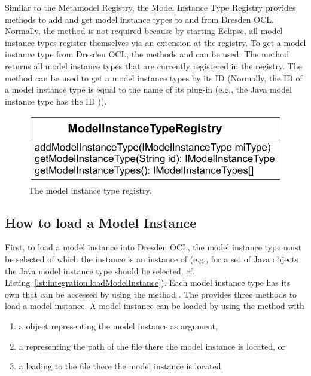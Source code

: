 Similar to the Metamodel Registry, the Model Instance Type Registry provides 
methods to add and get model instance types to and from Dresden OCL. Normally,
the method 
is not required because by starting Eclipse, all model instance types register
themselves via an extension at the registry. To get a model instance type from
Dresden OCL, the methods  and
 can be used. The method 
 returns all model instance types that are
currently registered in the registry. The method  can be used to get a model instance types by its ID (Normally, the ID 
of a model instance type is equal to the name of its plug-in (e.g., the Java 
model instance type has the ID 
)).

\begin{figure}[!b]
	\centering
	\includegraphics[width=.7\linewidth]{figures/integration/modelInstanceTypeRegistry}
	\caption{The model instance type registry.}
	\label{pic:integration:modelInstanceTypeRegistry}
\end{figure}


\subsection{How to load a Model Instance}

First, to load a model instance into Dresden OCL, the model instance type must be
selected of which the instance is an instance of (e.g., for a set of Java
objects the Java model instance type should be selected, cf. 
Listing~\ref{lst:integration:loadModelInstance}). Each model instance type has
its own  that can be accessed by using the
method . The 
 provides three methods to load a model instance. 
A model instance can be loaded by using the method  
with

\begin{enumerate}
	\item a  object representing the model instance as argument,
	\item a  representing the path of the file there the model
	  instance is located, or
	\item a  leading to the file there the model instance is located.
\end{enumerate}

